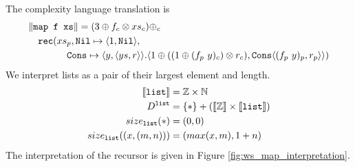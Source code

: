 %
The complexity language translation is
%
\begin{equation*}
\begin{split}
    &\|\texttt{map f xs}\| = (3 \oplus f_c \otimes xs_c) \oplus_c \\
    &\quad \texttt{rec}(xs_p, \texttt{Nil}\mapsto \langle 1, \texttt{Nil}\rangle, \\
    &\qquad\quad\quad \texttt{Cons} \mapsto \langle y, \langle ys, r \rangle \rangle. \langle 1 \oplus ((1 \oplus (f_p\ y)_c) \otimes r_c), \texttt{Cons} \langle (f_p\ y)_p, r_p \rangle \rangle)
\end{split}
\end{equation*}
%
We interpret lists as a pair of their largest element and length.
%
\begin{align*}
  \llbracket \texttt{list} \rrbracket &= \mathbb{Z} \times \mathbb{N} \\
  D^{\texttt{list}} &= \{*\} + (\llbracket \mathbb{Z} \rrbracket \times \llbracket \texttt{list} \rrbracket) \\
  size_{\texttt{list}}(*) &= (0, 0) \\
  size_{\texttt{list}}((x, (m, n))) &= (max(x, m), 1 + n)
\end{align*}
%
The interpretation of the recursor is given in Figure \ref{fig:ws_map_interpretation}.
%
